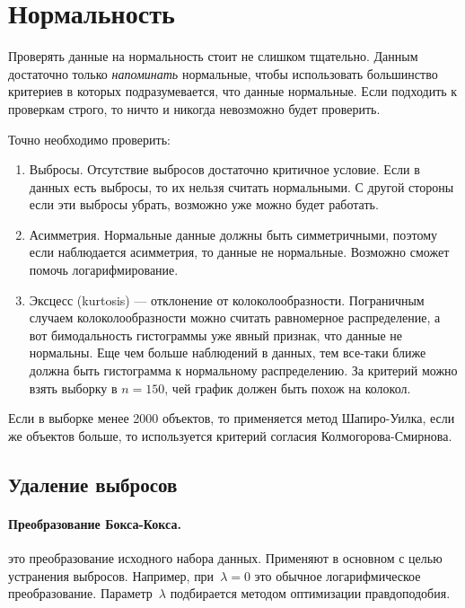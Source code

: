 \documentclass[../handbook.tex]{subfiles}
\begin{document}
\section{Нормальность}
Проверять данные на нормальность стоит не слишком тщательно. Данным достаточно только \emph{напоминать} нормальные, чтобы использовать большинство критериев в которых подразумевается, что данные нормальные. Если подходить к проверкам строго, то ничто и никогда невозможно будет проверить. 

Точно необходимо проверить:
\begin{enumerate}
    \item Выбросы. Отсутствие выбросов достаточно критичное условие. Если в данных есть выбросы, то их нельзя считать нормальными. С другой стороны если эти выбросы убрать, возможно уже можно будет работать.

    
    \item Асимметрия.\marginnote{ \[A = \frac{\mu_3}{\sigma^3}\]}
        Нормальные данные должны быть симметричными, поэтому если наблюдается асимметрия, то данные не нормальные. Возможно сможет помочь логарифмирование. 

    \item Эксцесс (kurtosis) --- отклонение от колоколообразности.
        \marginnote{ \[\gamma_2 = \frac{\mu_4}{\sigma^4} - 3\]}
        Пограничным случаем колоколообразности можно считать равномерное распределение, а вот бимодальность гистограммы уже явный признак, что данные не нормальны. Еще чем больше наблюдений в данных, тем все-таки ближе должна быть гистограмма к нормальному распределению. За критерий можно взять выборку в $n=150$, чей график должен быть похож на колокол.
\end{enumerate}

Если в выборке менее 2000 объектов, то применяется метод Шапиро-Уилка, если же объектов больше, то используется критерий согласия Колмогорова-Смирнова.

\subsection{Удаление выбросов}
\paragraph{Преобразование Бокса-Кокса.} 
это преобразование исходного набора
данных. Применяют в основном с целью устранения выбросов. Например,
при~$\lambda = 0$ это обычное логарифмическое преобразование.
Параметр~$\lambda$ подбирается методом оптимизации правдоподобия.
\end{document}
